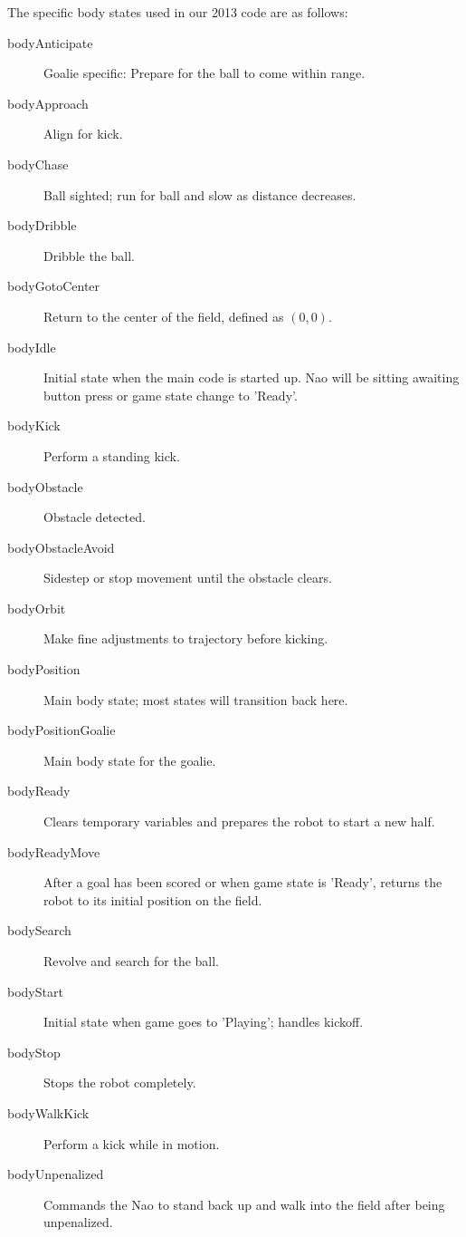 \documentclass{article}
\begin{document}
		The specific body states used in our 2013 code are as follows:
		\begin{multicols}{2}
			\begin{description}
				\item[bodyAnticipate] Goalie specific: Prepare for the ball to come within range.
				\item[bodyApproach] Align for kick.
				\item[bodyChase] Ball sighted; run for ball and slow as distance decreases.
				\item[bodyDribble] Dribble the ball.
				\item[bodyGotoCenter] Return to the center of the field, defined as $(0,0)$.
				\item[bodyIdle] Initial state when the main code is started up. Nao will be sitting awaiting button press or game state change to 'Ready'.
				\item[bodyKick] Perform a standing kick.
				\item[bodyObstacle] Obstacle detected.
				\item[bodyObstacleAvoid] Sidestep or stop movement until the obstacle clears.
				\item[bodyOrbit] Make fine adjustments to trajectory before kicking.
				\item[bodyPosition] Main body state; most states will transition back here.
				\item[bodyPositionGoalie] Main body state for the goalie.
				\item[bodyReady] Clears temporary variables and prepares the robot to start a new half.
				\item[bodyReadyMove] After a goal has been scored or when game state is 'Ready', returns the robot to its initial position on the field.
				\item[bodySearch] Revolve and search for the ball.
				\item[bodyStart] Initial state when game goes to 'Playing'; handles kickoff.
				\item[bodyStop] Stops the robot completely.
				\item[bodyWalkKick] Perform a kick while in motion.
				\item[bodyUnpenalized] Commands the Nao to stand back up and walk into the field after being unpenalized.
			\end{description}
		\end{multicols}
		
\end{document}
